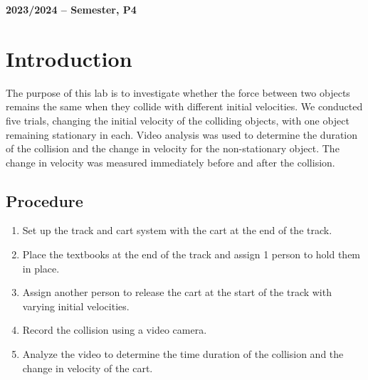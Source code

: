 \documentclass[12pt]{article}
\begin{document}
\begin{center}
    \large \bf 2023/2024 --  Semester, P4
\end{center}

\thispagestyle{empty}

\setcounter{page}{0}

\newpage

\tableofcontents 

\newpage

\section{Introduction}

The purpose of this lab is to investigate whether the force between two objects remains the same when they collide with different initial velocities. We conducted five trials, changing the initial velocity of the colliding objects, with one object remaining stationary in each. Video analysis was used to determine the duration of the collision and the change in velocity for the non-stationary object. The change in velocity was measured immediately before and after the collision.

\subsection*{Procedure}

\begin{enumerate}
    \item Set up the track and cart system with the cart at the end of the track.
    \item Place the textbooks at the end of the track and assign 1 person to hold them in place.
    \item Assign another person to release the cart at the start of the track with varying initial velocities.
    \item Record the collision using a video camera.
    \item Analyze the video to determine the time duration of the collision and the change in velocity of the cart.
\end{enumerate}
\end{document}
